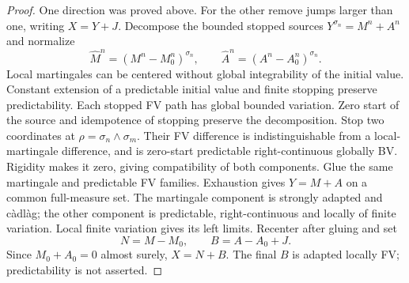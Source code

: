 \begin{proof}
One direction was proved above. For the other remove jumps larger than one,
writing $X=Y+J$. Decompose the bounded stopped sources
$Y^{\sigma_n}=M^n+A^n$ and normalize
\[
 \widehat M^n=(M^n-M^n_0)^{\sigma_n},\qquad
 \widehat A^n=(A^n-A^n_0)^{\sigma_n}.
\]
Local martingales can be centered without global integrability of the initial
value. Constant extension of a predictable initial value and finite stopping
preserve predictability. Each stopped FV path has global bounded variation.
Zero start of the source and idempotence of stopping preserve the decomposition.
Stop two coordinates at $\rho=\sigma_n\wedge\sigma_m$.
Their FV difference is indistinguishable from a local-martingale difference,
and is zero-start predictable right-continuous globally BV. Rigidity makes
it zero, giving compatibility of both components.
Glue the same martingale and predictable FV families. Exhaustion gives
$Y=M+A$ on a common full-measure set. The martingale component is strongly adapted and c\`adl\`ag; the other
component is predictable, right-continuous and locally of finite variation.
Local finite variation gives its left limits. Recenter after gluing and set
\[
 N=M-M_0,\qquad B=A-A_0+J.
\]
Since $M_0+A_0=0$ almost surely, $X=N+B$.
The final $B$ is adapted locally FV; predictability is not asserted.
\end{proof}

